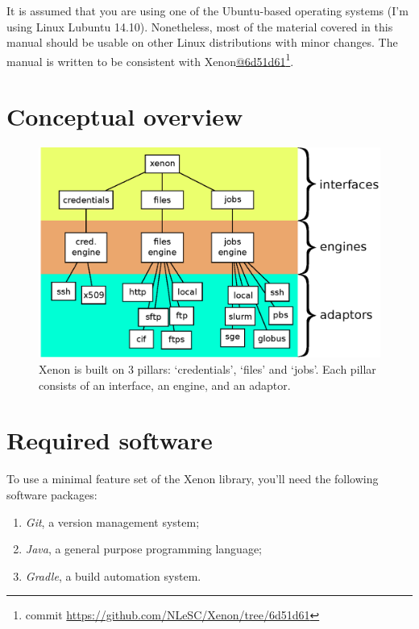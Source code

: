 \documentclass[12pt, a4paper, twoside,openany,titlepage]{article}
\begin{document}
It is assumed that you are using one of the Ubuntu-based operating systems (I'm using Linux Lubuntu 14.10). Nonetheless, most of the material covered in this manual should be usable on other Linux distributions with minor changes. The manual is written to be consistent with Xenon\url{@6d51d61}\footnote{commit \url{https://github.com/NLeSC/Xenon/tree/6d51d61}}.

\section{Conceptual overview}


\begin{figure}[ht]
\centering
\includegraphics[width=1.0\columnwidth]{images/xenon-design}
\caption{\label{fig:xenon-design} Xenon is built on 3 pillars: `credentials', `files' and `jobs'. Each pillar consists of an interface, an engine, and an adaptor.}
\end{figure}


\section{Required software}

To use a minimal feature set of the Xenon library, you'll need the following software packages:
\begin{enumerate}
\item{\textit{Git}, a version management system;}
\item{\textit{Java}, a general purpose programming language;}
\item{\textit{Gradle}, a build automation system.}
\end{enumerate}
\end{document}
